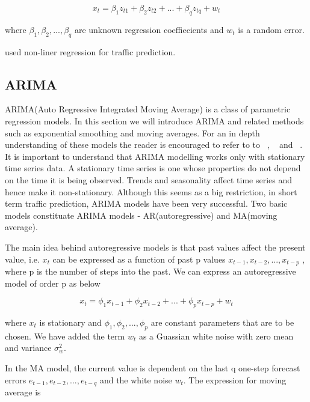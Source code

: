         \begin{equation}
            x_{t} = \beta_{1}z_{t1} + \beta_{2}z_{t2} + ... + \beta_{q}z_{tq} + w_{t}
        \end{equation}

where $ \beta_{1}, \beta_{2},...,\beta_{q} $ are unknown regression coeffiecients and $w_{t}$ is
a random error.

\citet{hogberg1976estimation} used non-liner regression for traffic prediction.

\subsection{ARIMA}

ARIMA(Auto Regressive Integrated Moving Average) is a class of parametric regression models. In
this section we will introduce ARIMA and related methods such as exponential smoothing and moving
averages. For an in depth understanding of these models the reader is encouraged to refer to to
~\citet{tong1990non}, ~\citet{brockwell2006introduction} and ~\citet{box2015time}. It is
important to understand that ARIMA modelling works only with stationary time series data. A
stationary time series is one whose properties do not depend on the time it is being observed.
Trends and seasonality affect time series and hence make it non-stationary. Although this seems as a
big restriction, in short term traffic prediction, ARIMA models have been very successful. Two
basic models constituate ARIMA models - AR(autoregressive) and MA(moving average).

The main idea behind autoregressive models is that past values affect the present value, i.e.
$x_{t}$ can be expressed as a function of past p values $ x_{t-1}, x_{t-2},...,x_{t-p} $ , where
p is the number of steps into the past. We can express an autoregressive model of order p as below

        \begin{equation} \label{eq:autoregressive}
          x_{t} = \phi_{1}x_{t-1} + \phi_{2}x_{t-2} + ... + \phi_{p}x_{t-p} + w_{t}
        \end{equation}

where $x_{t}$ is stationary and $\phi_{1}, \phi_{2},..., \phi_{p}$ are constant
parameters that are to be chosen. We have added the term $w_{t}$ as a Guassian white noise with
zero mean and variance $\sigma^{2}_{w}$.

In the MA model, the current value is dependent on the last q one-step forecast errors
$e_{t-1}, e_{t-2},...,e_{t-q}$ and the white noise $w_{t}$. The expression for moving average
is

